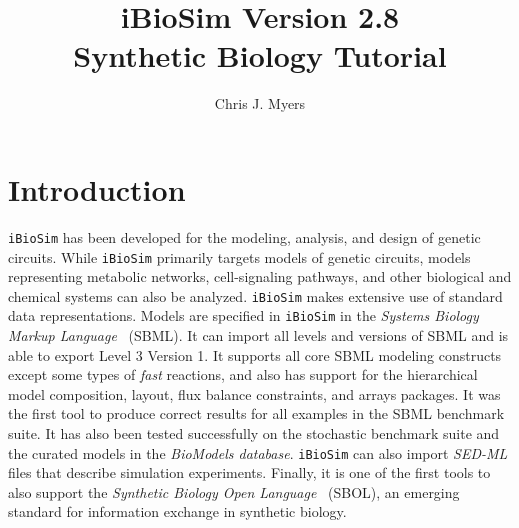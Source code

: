 \documentclass[titlepage,11pt]{article}
\title{iBioSim Version 2.8 \\ Synthetic Biology Tutorial}
\author{Chris J. Myers}
\begin{document}
\maketitle

  
\tableofcontents

\clearpage

\section{Introduction}

\noindent
{\tt iBioSim} has been developed for the modeling, analysis, and design of genetic circuits.  While {\tt iBioSim} primarily targets models of genetic circuits, models representing metabolic networks, cell-signaling pathways, and other biological and chemical systems can also be analyzed.  
{\tt iBioSim} makes extensive use of standard data representations.  Models are specified in {\tt iBioSim} in the %
\emph{Systems Biology Markup Language}
~(SBML).  It can import all levels and versions of SBML and is able to export Level 3 Version 1.  It supports all core SBML modeling constructs except some types of \emph{fast} reactions, and also has support for the hierarchical model composition, layout, flux balance constraints, and arrays packages.  It was the first tool to produce correct results for all examples in the SBML benchmark suite.  It has also been tested successfully on the stochastic benchmark suite and the curated models in the 
\emph{BioModels database}.
{\tt iBioSim} can also import 
\emph{SED-ML} files 
that describe simulation experiments.  Finally, it is one of the first tools to also support the 
\emph{Synthetic Biology Open Language}
~(SBOL), an emerging standard for information exchange in synthetic biology.
\end{document}

